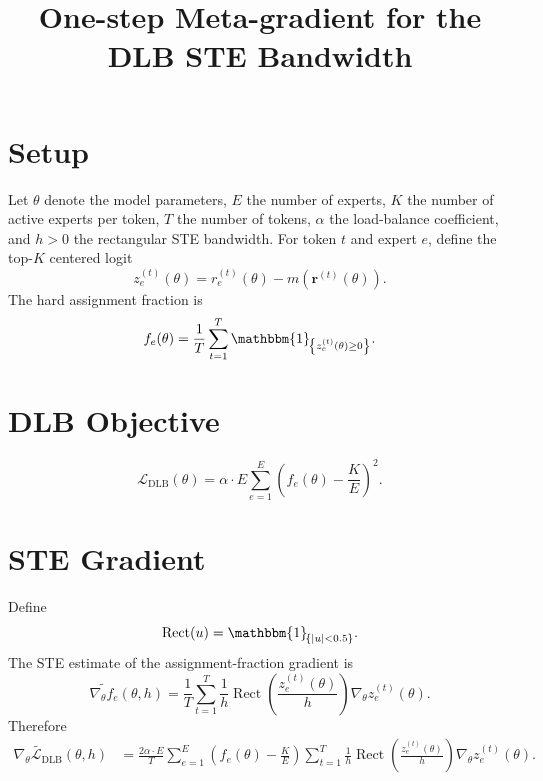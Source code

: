 \documentclass[11pt]{article}
\title{One-step Meta-gradient for the DLB STE Bandwidth}
\author{}
\date{}
\newcommand{\indic}[1]{\mathbbm{1}_{\!\left\{#1\right\}}}
\newcommand{\totalexperts}{E}
\newcommand{\activeexperts}{K}
\newcommand{\batchsize}{T}
\newcommand{\routinglogits}{r}
\newcommand{\assignmentfraction}{f}
\newcommand{\modelparams}{\theta}
\newcommand{\kthlargest}{m}
\newcommand{\lbcoef}{\alpha}
\newcommand{\bandwidth}{h}
\newcommand{\rect}{\operatorname{Rect}}
\newcommand{\dlbloss}{\mathcal{L}_{\mathrm{DLB}}}
\newcommand{\abs}[1]{\left\vert#1\right\vert}
\begin{document}
\maketitle

\section{Setup}

Let $\modelparams$ denote the model parameters, $\totalexperts$ the number of
experts, $\activeexperts$ the number of active experts per token,
$\batchsize$ the number of tokens, $\lbcoef$ the load-balance coefficient,
and $\bandwidth>0$ the rectangular STE bandwidth.
For token $t$ and expert $e$, define the top-$\activeexperts$ centered logit
\[
  z_e^{(t)}(\modelparams)
  =
  \routinglogits_e^{(t)}(\modelparams)
  -
  \kthlargest(\mathbf r^{(t)}(\modelparams)).
\]
The hard assignment fraction is
\[
  \assignmentfraction_e(\modelparams)
  =
  \frac{1}{\batchsize}
  \sum_{t=1}^{\batchsize}
  \indic{z_e^{(t)}(\modelparams)\geq 0}.
\]

\section{DLB Objective}

\[
  \dlbloss(\modelparams)
  =
  \lbcoef \cdot \totalexperts
  \sum_{e=1}^{\totalexperts}
  \left(
    \assignmentfraction_e(\modelparams)
    -
    \frac{\activeexperts}{\totalexperts}
  \right)^2.
\]

\section{STE Gradient}

Define
\[
  \rect(u)=\indic{\abs{u}<0.5}.
\]
The STE estimate of the assignment-fraction gradient is
\[
  \widetilde{\nabla_{\modelparams}\assignmentfraction_e}
  (\modelparams,\bandwidth)
  =
  \frac{1}{\batchsize}
  \sum_{t=1}^{\batchsize}
  \frac{1}{\bandwidth}
  \rect\!\left(
    \frac{z_e^{(t)}(\modelparams)}{\bandwidth}
  \right)
  \nabla_{\modelparams} z_e^{(t)}(\modelparams).
\]
Therefore
\[
\begin{aligned}
  \widetilde{\nabla_{\modelparams}\dlbloss}
  (\modelparams,\bandwidth)
  &=
  \frac{2\lbcoef \cdot \totalexperts}{\batchsize}
  \sum_{e=1}^{\totalexperts}
  \left(
    \assignmentfraction_e(\modelparams)
    -
    \frac{\activeexperts}{\totalexperts}
  \right)
  \sum_{t=1}^{\batchsize}
  \frac{1}{\bandwidth}
  \rect\!\left(
    \frac{z_e^{(t)}(\modelparams)}{\bandwidth}
  \right)
  \nabla_{\modelparams} z_e^{(t)}(\modelparams).
\end{aligned}
\]
\end{document}
